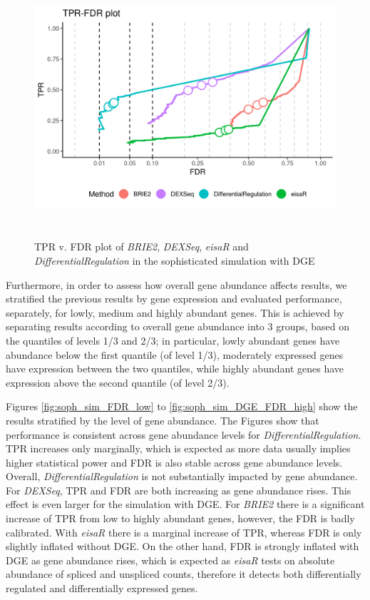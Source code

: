 \begin{figure}[!htb]
\begin{center}
\includegraphics[width=6in,height=3.8in]{../figures/simulation/minnow_simulation_DGE_FDR.png}
\end{center}
\caption{TPR v. FDR plot of \emph{BRIE2}, \emph{DEXSeq}, \emph{eisaR} and \emph{DifferentialRegulation} in the sophisticated simulation with DGE}
\label{fig:soph_sim_DGE_FDR}
\end{figure}

Furthermore, in order to assess how overall gene abundance affects results, we stratified the previous results by gene expression and evaluated performance, separately, for lowly, medium and highly abundant genes. This is achieved by separating results according to overall gene abundance into 3 groups, based on the quantiles of levels 1/3 and 2/3; in particular, lowly abundant genes have abundance below the first quantile (of level 1/3), moderately expressed genes have expression between the two quantiles, while highly abundant genes have expression above the second quantile (of level 2/3).

Figures \ref{fig:soph_sim_FDR_low} to \ref{fig:soph_sim_DGE_FDR_high} show the results stratified by the level of gene abundance. The Figures show that performance is consistent across gene abundance levels for \emph{DifferentialRegulation}. TPR increases only marginally, which is expected as more data usually implies higher statistical power and FDR is also stable across gene abundance levels. Overall, \emph{DifferentialRegulation} is not substantially impacted by gene abundance. For \emph{DEXSeq}, TPR and FDR are both increasing as gene abundance rises. This effect is even larger for the simulation with DGE. For \emph{BRIE2} there is a significant increase of TPR from low to highly abundant genes, however, the FDR is badly calibrated. With \emph{eisaR} there is a marginal increase of TPR, whereas FDR is only slightly inflated without DGE. On the other hand, FDR is strongly inflated with DGE as gene abundance rises, which is expected as \emph{eisaR} tests on absolute abundance of spliced and unspliced counts, therefore it detects both differentially regulated and differentially expressed genes.


